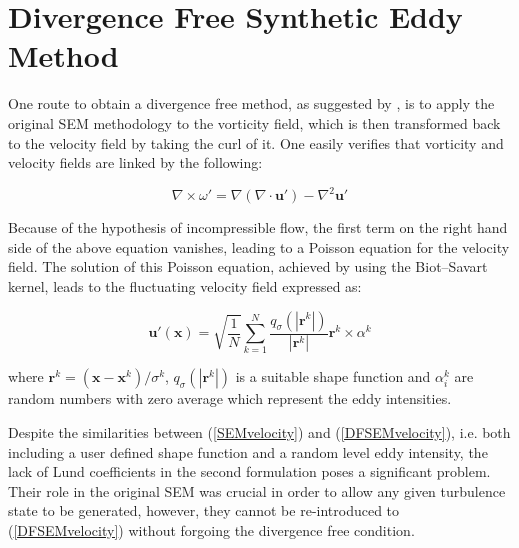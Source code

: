 \section{Divergence Free Synthetic Eddy Method}

One route to obtain a divergence free method, as suggested by \cite{poletto2013}, is to apply the original SEM methodology to the vorticity field, which is then transformed back to the velocity field by taking the curl of it. One easily verifies that vorticity and velocity fields are linked by the following:

\begin{equation}
	\nabla\times\omega' = \nabla(\nabla\cdot\boldsymbol{u}')-\nabla^2\boldsymbol{u}'
\end{equation}

\noindent Because of the hypothesis of incompressible flow, the first term on the right hand side of the above equation vanishes, leading to a Poisson equation for the velocity field. The solution of this Poisson equation, achieved by using the Biot–Savart kernel, leads to the fluctuating velocity field expressed as:

\begin{equation} \label{DFSEMvelocity}
	\boldsymbol{u}'(\boldsymbol{x}) = \sqrt{\frac{1}{N}}\sum_{k=1}^N\frac{q_{\sigma}(|\boldsymbol{r}^k|)}{|\boldsymbol{r}^k|}\boldsymbol{r}^k\times\alpha^k
\end{equation}

\noindent where $\boldsymbol{r}^k=(\boldsymbol{x}-\boldsymbol{x}^k)/\sigma^k$, $q_{\sigma}(|\boldsymbol{r}^k|)$ is a suitable shape function and $\alpha_i^k$ are random numbers with zero average which represent the eddy intensities.

Despite the similarities between (\ref{SEMvelocity}) and (\ref{DFSEMvelocity}), i.e. both including a user defined shape function and a random level eddy intensity, the lack of Lund coefficients in the second formulation poses a significant problem. Their role in the original SEM was crucial in order to allow any given turbulence state to be generated, however, they cannot be re-introduced to (\ref{DFSEMvelocity}) without forgoing the divergence free condition.

